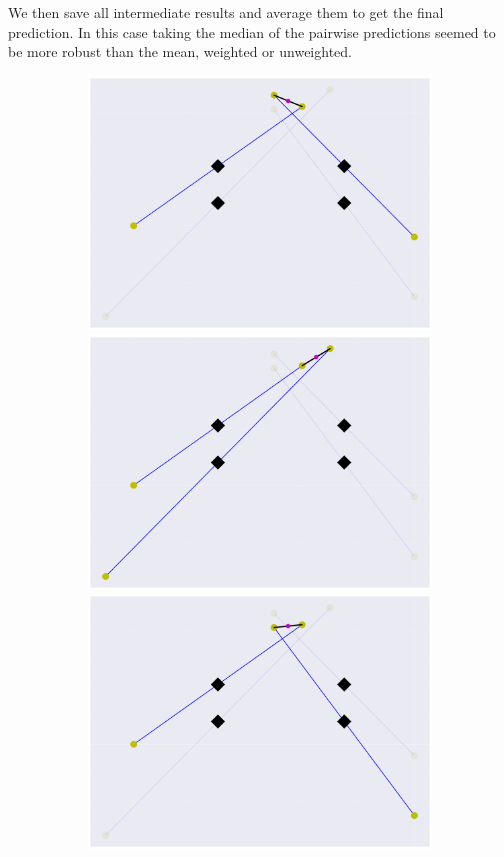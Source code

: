 We then save all intermediate results and average them to get the final prediction.
In this case taking the median of the pairwise predictions seemed to be more robust
than the mean, weighted or unweighted.

\begin{figure}
    \centering
    \begin{subfigure}{0.45\textwidth}
        \includegraphics[width=0.8\linewidth]{Plots/stereo_magic_1.pdf}
        \includegraphics[width=0.8\linewidth]{Plots/stereo_magic_2.pdf}
        \includegraphics[width=0.8\linewidth]{Plots/stereo_magic_3.pdf}

\end{subfigure}
\end{figure}
